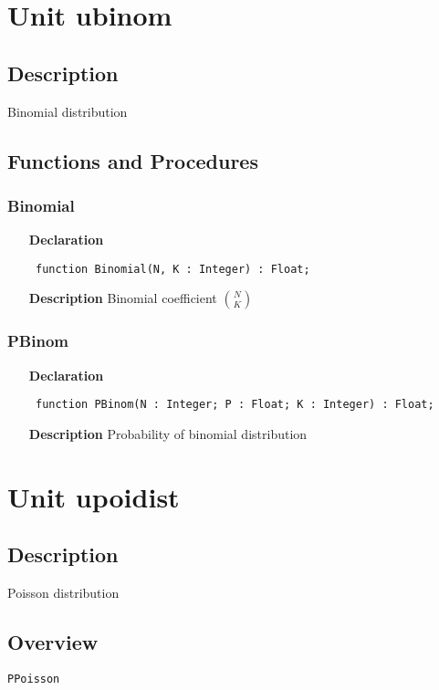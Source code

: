 \documentclass[12pt,a4paper,oneside]{report}
\newcommand{\declarationitem}[1]{\textbf{#1}}
\newcommand{\descriptiontitle}[1]{\textbf{#1}}
\newcommand{\code}[1]{\texttt{#1}}
\begin{document}
\section{Unit ubinom}
\label{ubinom}
\subsection{Description}
Binomial distribution 
\subsection{Functions and Procedures}
\subsubsection{Binomial}
\label{ubinom-Binomial}
\begin{itemize}\item[\declarationitem{Declaration}\hfill]
	\begin{flushleft}
		\code{
			function Binomial(N, K : Integer) : Float;}
	\end{flushleft}
	\item[\descriptiontitle{Description}]
	Binomial coefficient $\binom{N}{K}$
\end{itemize}
\subsubsection{PBinom}
\label{ubinom-PBinom}
\begin{itemize}\item[\declarationitem{Declaration}\hfill]
	\begin{flushleft}
		\code{
			function PBinom(N : Integer; P : Float; K : Integer) : Float;}
	\end{flushleft}
	\item[\descriptiontitle{Description}]
	Probability of binomial distribution
\end{itemize}
\section{Unit upoidist}
\label{upoidist}
\subsection{Description}
Poisson distribution 
\subsection{Overview}
\begin{description}
	\item[\texttt{PPoisson}]
\end{description}
\end{document}
